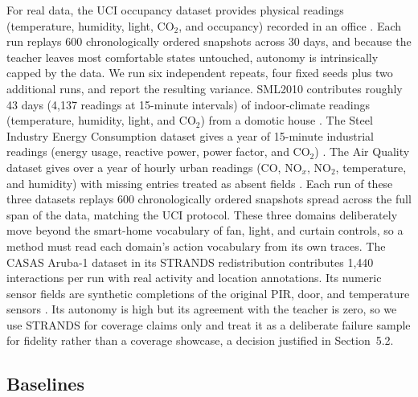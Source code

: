 \documentclass[11pt,a4paper]{article}
\begin{document}
For real data, the UCI occupancy dataset provides physical readings
(temperature, humidity, light, CO$_2$, and occupancy) recorded in an office
\cite{28}. Each run replays 600 chronologically ordered snapshots across 30
days, and because the teacher leaves most comfortable states untouched,
autonomy is intrinsically capped by the data. We run six independent repeats,
four fixed seeds plus two additional runs, and report the resulting variance.
SML2010 contributes roughly 43 days (4,137 readings at 15-minute intervals) of indoor-climate readings
(temperature, humidity, light, and CO$_2$) from a domotic house \cite{33}.
The Steel Industry Energy Consumption dataset gives a year of 15-minute
industrial readings (energy usage, reactive power, power factor, and CO$_2$)
\cite{34}. The Air Quality dataset gives over a year of hourly urban readings
(CO, NO$_x$, NO$_2$, temperature, and humidity) with missing entries treated
as absent fields \cite{35}. Each run of these three datasets replays 600
chronologically ordered snapshots spread across the full span of the data,
matching the UCI protocol. These three domains deliberately move beyond the
smart-home
vocabulary of fan, light, and curtain controls, so a method must read each
domain's action vocabulary from its own traces. The CASAS Aruba-1 dataset in
its STRANDS redistribution contributes 1,440 interactions per run with real
activity and location annotations. Its numeric sensor fields are synthetic
completions of the original PIR, door, and temperature sensors \cite{29}. Its
autonomy is high but its agreement with the teacher is zero, so we use
STRANDS for coverage claims only and treat it as a deliberate failure sample
for fidelity rather than a coverage showcase, a decision justified in
Section~5.2.

\subsection{Baselines}
\end{document}
